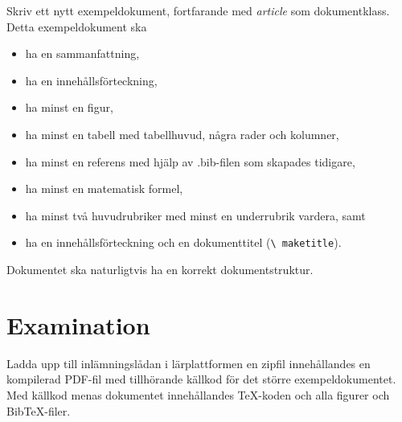 \documentclass[a4paper]{miunasgn}
\begin{document}
Skriv ett nytt exempeldokument, fortfarande med \emph{article} som 
dokumentklass.
Detta exempeldokument ska
\begin{itemize}
  \item ha en sammanfattning,
  \item ha en innehållsförteckning,
  \item ha minst en figur,
  \item ha minst en tabell med tabellhuvud, några rader och kolumner,
  \item ha minst en referens med hjälp av .bib-filen som skapades tidigare,
  \item ha minst en matematisk formel,
  \item ha minst två huvudrubriker med minst en underrubrik vardera, samt
  \item ha en innehållsförteckning och en dokumenttitel (\texttt{\textbackslash 
    maketitle}).
\end{itemize}
Dokumentet ska naturligtvis ha en korrekt dokumentstruktur.


\section{Examination}
\label{sec:Examination}
\noindent
Ladda upp till inlämningslådan i lärplattformen en zipfil innehållandes en 
kompilerad PDF-fil med tillhörande källkod för det större exempeldokumentet.
Med källkod menas dokumentet innehållandes TeX-koden och alla figurer och 
BibTeX-filer.


\printbibliography
\end{document}
